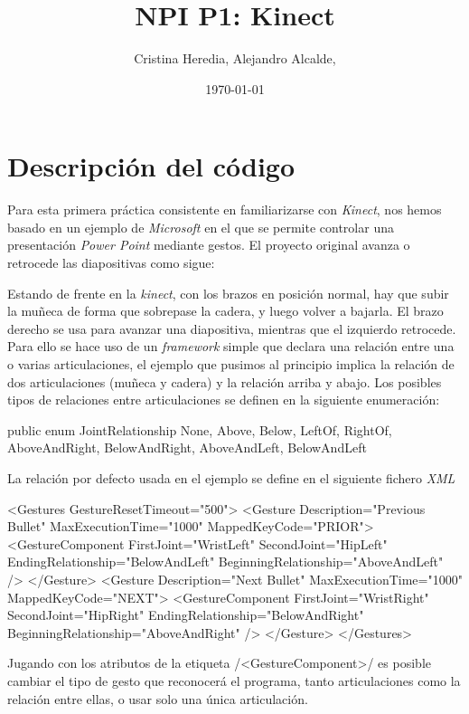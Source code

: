 \documentclass[	DIV=calc,%
							paper=a4,%
							fontsize=11pt]{scrartcl}	 					%
\title{NPI P1: Kinect}					%
\author{Cristina Heredia, Alejandro Alcalde,\;}											%
\date{\usefont{T1}{mdugm}{b}{it}\selectfont\today}																				%
\newcommand{\initial}[1]{%
     \lettrine[lines=3,lhang=0.3,nindent=0em]{
     				\color{DarkGoldenrod}
     				{\textsf{#1}}}{}}
\begin{document}
\maketitle
\tableofcontents
\thispagestyle{fancy} 			%
%

\section{Descripción del código}

Para esta primera práctica consistente en familiarizarse con \textit{Kinect}, nos hemos basado en un ejemplo de \textit{Microsoft} \cite{Walt} en el que se permite controlar una presentación \textit{Power Point} mediante gestos. El proyecto original avanza o retrocede las diapositivas como sigue:

Estando de frente en la \textit{kinect}, con los brazos en posición normal, hay que subir la muñeca de forma que sobrepase la cadera, y luego volver a bajarla. El brazo derecho se usa para avanzar una diapositiva, mientras que el izquierdo retrocede. Para ello se hace uso de un \textit{framework} simple que declara una relación entre una o varias articulaciones, el ejemplo que pusimos al principio implica la relación de dos articulaciones (muñeca y cadera) y la relación arriba y abajo. Los posibles tipos de relaciones entre articulaciones se definen en la siguiente enumeración:
\begin{csharpcode}
	public enum JointRelationship
    {
        None,
        Above,
        Below,
        LeftOf,
        RightOf,
        AboveAndRight,
        BelowAndRight,
        AboveAndLeft,
        BelowAndLeft
    }
\end{csharpcode}
La relación por defecto usada en el ejemplo se define en el siguiente fichero \textit{XML}
\begin{xmlcode}
<Gestures GestureResetTimeout="500">
	<Gesture Description="Previous Bullet" MaxExecutionTime="1000" MappedKeyCode="PRIOR">
		<GestureComponent FirstJoint="WristLeft" SecondJoint="HipLeft" EndingRelationship="BelowAndLeft" BeginningRelationship="AboveAndLeft" />
	</Gesture>
	<Gesture Description="Next Bullet" MaxExecutionTime="1000" MappedKeyCode="NEXT">
			<GestureComponent FirstJoint="WristRight" SecondJoint="HipRight" EndingRelationship="BelowAndRight" BeginningRelationship="AboveAndRight" />
	</Gesture>
</Gestures>
\end{xmlcode}
Jugando con los atributos de la etiqueta \xmlinline/<GestureComponent>/ es posible cambiar el tipo de gesto que reconocerá el programa, tanto articulaciones como la relación entre ellas, o usar solo una única articulación.
\end{document}
